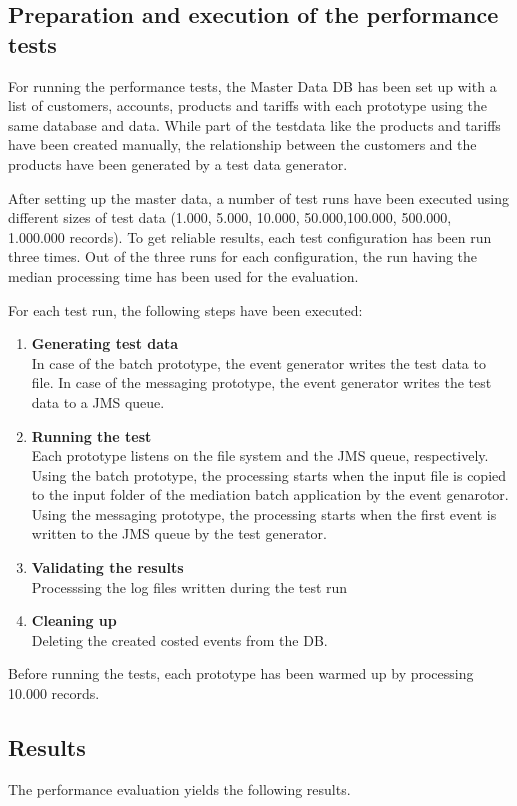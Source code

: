 \subsection{Preparation and execution of the performance tests}
For running the performance tests, the Master Data DB has been set up with a list of customers, accounts, products and tariffs with each prototype using the same database and data. While part of the testdata like the products and tariffs have been created manually, the relationship between the customers and the products have been generated by a test data generator.

After setting up the master data, a number of test runs have been executed using different sizes of test data (1.000, 5.000, 10.000, 50.000,100.000, 500.000, 1.000.000 records). To get reliable results, each test configuration has been run three times. Out of the three runs for each configuration, the run having the median processing time has been used for the evaluation.

For each test run, the following steps have been executed:
\begin{enumerate}
	\item \textbf{Generating test data}\\In case of the batch prototype, the event generator writes the test data to file. In case of the messaging prototype, the event generator writes the test data to a JMS queue.
	\item \textbf{Running the test}\\Each prototype listens on the file system and the JMS queue, respectively. Using the batch prototype, the processing starts when the input file is copied to the input folder of the mediation batch application by the event genarotor. Using the messaging prototype, the processing starts when the first event is written to the JMS queue by the test generator.
	\item \textbf{Validating the results}\\Processsing the log files written during the test run
	\item \textbf{Cleaning up}\\Deleting the created costed events from the DB.
\end{enumerate}

Before running the tests, each prototype has been warmed up by processing 10.000 records.

\subsection{Results} \label{results}
The performance evaluation yields the following results.

